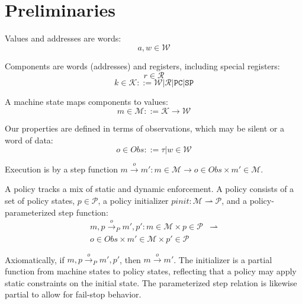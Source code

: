 \documentclass[conference]{IEEEtran}
\begin{document}
  \section{Preliminaries}


    Values and addresses are words:
    \[a,w \in \mathcal{W}\]

    Components are words (addresses) and registers, including special registers:
    \[r \in \mathcal{R}\]
    \[k \in \mathcal{K} ::= \mathcal{W} | \mathcal{R} | \mathtt{PC} | \mathtt{SP}\]


    A machine state maps components to values:
    \[m \in \mathcal{M} ::= \mathcal{K} \rightarrow \mathcal{W}\]

    Our properties are defined in terms of observations, which may be silent or a word of data:
    \[o \in \mathit{Obs} ::= \tau | w \in \mathcal{W}\]
    
    Execution is by a step function \(m \xrightarrow{o} m' : m \in \mathcal{M} \rightarrow
    o \in \mathit{Obs} \times m' \in \mathcal{M}\).

    A policy tracks a mix of static and dynamic enforcement. A policy consists of
    a set of policy states, \(p \in \mathcal{P}\), a policy initializer
    \(pinit : \mathcal{M} \rightharpoonup \mathcal{P}\), and a policy-parameterized step function:
    \[\begin{split}
      m, p \xrightarrow{o}_P m', p' : m \in \mathcal{M} \times p \in \mathcal{P} & \rightharpoonup \\
      o \in \mathit{Obs} \times m' \in \mathcal{M} \times p' \in \mathcal{P} &
    \end{split}\]

    Axiomatically, if \(m,p \xrightarrow{o}_P m',p'\), then \(m \xrightarrow{o} m'\).
    The initializer is a partial function from machine states to policy
    states, reflecting that a policy may apply static constraints on the initial state. The parameterized
    step relation is likewise partial to allow for fail-stop behavior.
\end{document}
